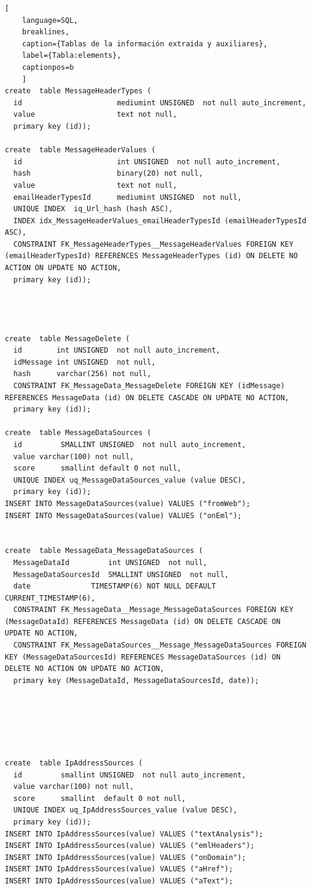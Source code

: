 \begin{lstlisting}[
    language=SQL,
    breaklines, 
    caption={Tablas de la información extraida y auxiliares}, 
    label={Tabla:elements}, 
    captionpos=b
    ]
create  table MessageHeaderTypes (
  id                      mediumint UNSIGNED  not null auto_increment, 
  value                   text not null, 
  primary key (id));

create  table MessageHeaderValues (
  id                      int UNSIGNED  not null auto_increment, 
  hash                    binary(20) not null, 
  value                   text not null, 
  emailHeaderTypesId      mediumint UNSIGNED  not null, 
  UNIQUE INDEX  iq_Url_hash (hash ASC),
  INDEX idx_MessageHeaderValues_emailHeaderTypesId (emailHeaderTypesId ASC),
  CONSTRAINT FK_MessageHeaderTypes__MessageHeaderValues FOREIGN KEY (emailHeaderTypesId) REFERENCES MessageHeaderTypes (id) ON DELETE NO ACTION ON UPDATE NO ACTION,
  primary key (id));




create  table MessageDelete (
  id        int UNSIGNED  not null auto_increment, 
  idMessage int UNSIGNED  not null, 
  hash      varchar(256) not null, 
  CONSTRAINT FK_MessageData_MessageDelete FOREIGN KEY (idMessage) REFERENCES MessageData (id) ON DELETE CASCADE ON UPDATE NO ACTION,
  primary key (id));

create  table MessageDataSources (
  id         SMALLINT UNSIGNED  not null auto_increment, 
  value varchar(100) not null, 
  score      smallint default 0 not null, 
  UNIQUE INDEX uq_MessageDataSources_value (value DESC),
  primary key (id));
INSERT INTO MessageDataSources(value) VALUES ("fromWeb");
INSERT INTO MessageDataSources(value) VALUES ("onEml");


create  table MessageData_MessageDataSources (
  MessageDataId         int UNSIGNED  not null, 
  MessageDataSourcesId  SMALLINT UNSIGNED  not null,
  date              TIMESTAMP(6) NOT NULL DEFAULT CURRENT_TIMESTAMP(6),
  CONSTRAINT FK_MessageData__Message_MessageDataSources FOREIGN KEY (MessageDataId) REFERENCES MessageData (id) ON DELETE CASCADE ON UPDATE NO ACTION,
  CONSTRAINT FK_MessageDataSources__Message_MessageDataSources FOREIGN KEY (MessageDataSourcesId) REFERENCES MessageDataSources (id) ON DELETE NO ACTION ON UPDATE NO ACTION,
  primary key (MessageDataId, MessageDataSourcesId, date));






create  table IpAddressSources (
  id         smallint UNSIGNED  not null auto_increment, 
  value varchar(100) not null, 
  score      smallint  default 0 not null, 
  UNIQUE INDEX uq_IpAddressSources_value (value DESC),
  primary key (id));
INSERT INTO IpAddressSources(value) VALUES ("textAnalysis");
INSERT INTO IpAddressSources(value) VALUES ("emlHeaders");
INSERT INTO IpAddressSources(value) VALUES ("onDomain");
INSERT INTO IpAddressSources(value) VALUES ("aHref");
INSERT INTO IpAddressSources(value) VALUES ("aText");



\end{lstlisting}
